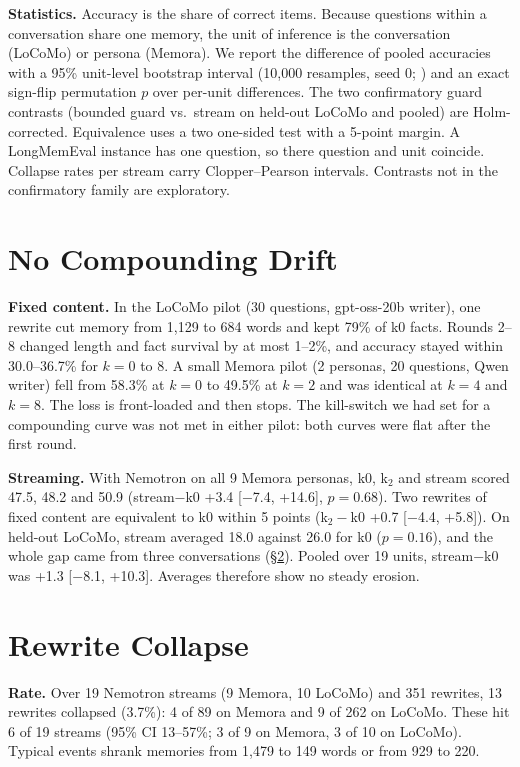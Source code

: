 \documentclass[11pt]{article}
\begin{document}
\textbf{Statistics.} Accuracy is the share of correct items. Because questions within a conversation share one memory, the unit of inference is the conversation (LoCoMo) or persona (Memora). We report the difference of pooled accuracies with a 95\% unit-level bootstrap interval (10,000 resamples, seed 0; \citealp{efron1994bootstrap}) and an exact sign-flip permutation $p$ over per-unit differences. The two confirmatory guard contrasts (bounded guard vs.\ stream on held-out LoCoMo and pooled) are Holm-corrected. Equivalence uses a two one-sided test with a 5-point margin. A LongMemEval instance has one question, so there question and unit coincide. Collapse rates per stream carry Clopper--Pearson intervals. Contrasts not in the confirmatory family are exploratory.

\section{No Compounding Drift}\label{sec:drift}
\textbf{Fixed content.} In the LoCoMo pilot (30 questions, gpt-oss-20b writer), one rewrite cut memory from 1,129 to 684 words and kept 79\% of k0 facts. Rounds 2--8 changed length and fact survival by at most 1--2\%, and accuracy stayed within 30.0--36.7\% for $k{=}0$ to 8. A small Memora pilot (2 personas, 20 questions, Qwen writer) fell from 58.3\% at $k{=}0$ to 49.5\% at $k{=}2$ and was identical at $k{=}4$ and $k{=}8$. The loss is front-loaded and then stops. The kill-switch we had set for a compounding curve was not met in either pilot: both curves were flat after the first round.

\textbf{Streaming.} With Nemotron on all 9 Memora personas, k0, k$_2$ and stream scored 47.5, 48.2 and 50.9 (stream$-$k0 +3.4 [$-$7.4, +14.6], $p{=}0.68$). Two rewrites of fixed content are equivalent to k0 within 5 points (k$_2-$k0 +0.7 [$-$4.4, +5.8]). On held-out LoCoMo, stream averaged 18.0 against 26.0 for k0 ($p{=}0.16$), and the whole gap came from three conversations (\S\ref{sec:collapse}). Pooled over 19 units, stream$-$k0 was +1.3 [$-$8.1, +10.3]. Averages therefore show no steady erosion.

\section{Rewrite Collapse}\label{sec:collapse}
\textbf{Rate.} Over 19 Nemotron streams (9 Memora, 10 LoCoMo) and 351 rewrites, 13 rewrites collapsed (3.7\%): 4 of 89 on Memora and 9 of 262 on LoCoMo. These hit 6 of 19 streams (95\% CI 13--57\%; 3 of 9 on Memora, 3 of 10 on LoCoMo). Typical events shrank memories from 1,479 to 149 words or from 929 to 220.
\end{document}
